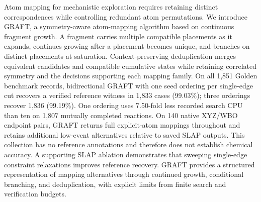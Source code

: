 Atom mapping for mechanistic exploration requires retaining distinct correspondences while controlling redundant atom permutations. We introduce GRAFT, a symmetry-aware atom-mapping algorithm based on continuous fragment growth. A fragment carries multiple compatible placements as it expands, continues growing after a placement becomes unique, and branches on distinct placements at saturation. Context-preserving deduplication merges equivalent candidates and compatible cumulative states while retaining correlated symmetry and the decisions supporting each mapping family. On all 1,851 Golden benchmark records, bidirectional GRAFT with one seed ordering per single-edge cut recovers a verified reference witness in 1,833 cases (99.03\%); three orderings recover 1,836 (99.19\%). One ordering uses 7.50-fold less recorded search CPU than ten on 1,807 mutually completed reactions. On 140 native XYZ/WBO endpoint pairs, GRAFT returns full explicit-atom mappings throughout and retains additional low-event alternatives relative to saved SLAP outputs. This collection has no reference annotations and therefore does not establish chemical accuracy. A supporting SLAP ablation demonstrates that sweeping single-edge constraint relaxations improves reference recovery. GRAFT provides a structured representation of mapping alternatives through continued growth, conditional branching, and deduplication, with explicit limits from finite search and verification budgets.
